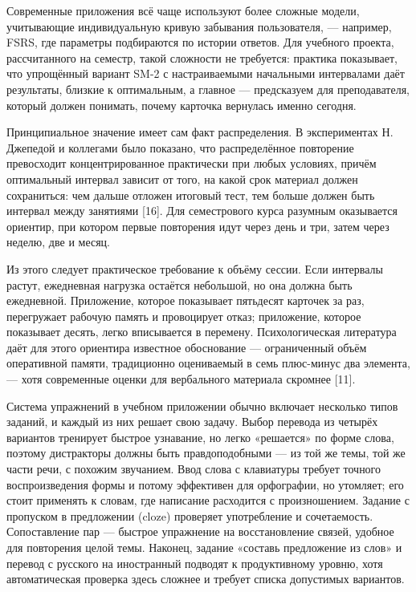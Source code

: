 \documentclass[11pt,a4paper,openany]{report}
\begin{document}
Современные приложения всё чаще используют более сложные модели, учитывающие индивидуальную кривую забывания пользователя, — например, FSRS, где параметры подбираются по истории ответов. Для учебного проекта, рассчитанного на семестр, такой сложности не требуется: практика показывает, что упрощённый вариант SM-2 с настраиваемыми начальными интервалами даёт результаты, близкие к оптимальным, а главное — предсказуем для преподавателя, который должен понимать, почему карточка вернулась именно сегодня.

Принципиальное значение имеет сам факт распределения. В экспериментах Н. Джепедой и коллегами было показано, что распределённое повторение превосходит концентрированное практически при любых условиях, причём оптимальный интервал зависит от того, на какой срок материал должен сохраниться: чем дальше отложен итоговый тест, тем больше должен быть интервал между занятиями [16]. Для семестрового курса разумным оказывается ориентир, при котором первые повторения идут через день и три, затем через неделю, две и месяц.

Из этого следует практическое требование к объёму сессии. Если интервалы растут, ежедневная нагрузка остаётся небольшой, но она должна быть ежедневной. Приложение, которое показывает пятьдесят карточек за раз, перегружает рабочую память и провоцирует отказ; приложение, которое показывает десять, легко вписывается в перемену. Психологическая литература даёт для этого ориентира известное обоснование — ограниченный объём оперативной памяти, традиционно оцениваемый в семь плюс-минус два элемента, — хотя современные оценки для вербального материала скромнее [11].

Система упражнений в учебном приложении обычно включает несколько типов заданий, и каждый из них решает свою задачу. Выбор перевода из четырёх вариантов тренирует быстрое узнавание, но легко «решается» по форме слова, поэтому дистракторы должны быть правдоподобными — из той же темы, той же части речи, с похожим звучанием. Ввод слова с клавиатуры требует точного воспроизведения формы и потому эффективен для орфографии, но утомляет; его стоит применять к словам, где написание расходится с произношением. Задание с пропуском в предложении (cloze) проверяет употребление и сочетаемость. Сопоставление пар — быстрое упражнение на восстановление связей, удобное для повторения целой темы. Наконец, задание «составь предложение из слов» и перевод с русского на иностранный подводят к продуктивному уровню, хотя автоматическая проверка здесь сложнее и требует списка допустимых вариантов.
\end{document}
